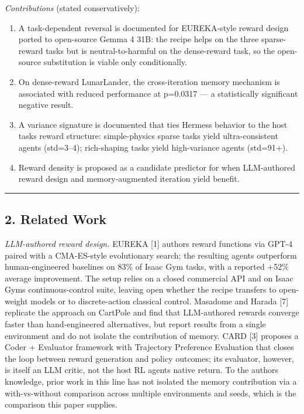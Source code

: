 \emph{Contributions} (stated conservatively):

\begin{enumerate}
\def\labelenumi{\arabic{enumi}.}
\tightlist
\item
  A task-dependent reversal is documented for EUREKA-style reward design ported to open-source Gemma 4 31B: the recipe helps on the three sparse-reward tasks but is neutral-to-harmful on the dense-reward task, so the open-source substitution is viable only conditionally.
\item
  On dense-reward LunarLander, the cross-iteration memory mechanism is associated with reduced performance at p=0.0317 --- a statistically significant negative result.
\item
  A variance signature is documented that ties Hermes\textquotesingle s behavior to the host task\textquotesingle s reward structure: simple-physics sparse tasks yield ultra-consistent agents (std=3--4); rich-shaping tasks yield high-variance agents (std=91+).
\item
  Reward density is proposed as a candidate predictor for when LLM-authored reward design and memory-augmented iteration yield benefit.
\end{enumerate}

\begin{center}\rule{0.5\linewidth}{0.5pt}\end{center}

\subsection{2. Related Work}\label{2-related-work}

\emph{LLM-authored reward design.} EUREKA {[}1{]} authors reward functions via GPT-4 paired with a CMA-ES-style evolutionary search; the resulting agents outperform human-engineered baselines on 83\% of Isaac Gym tasks, with a reported +52\% average improvement. The setup relies on a closed commercial API and on Isaac Gym\textquotesingle s continuous-control suite, leaving open whether the recipe transfers to open-weight models or to discrete-action classical control. Masadome and Harada {[}7{]} replicate the approach on CartPole and find that LLM-authored rewards converge faster than hand-engineered alternatives, but report results from a single environment and do not isolate the contribution of memory. CARD {[}3{]} proposes a Coder + Evaluator framework with Trajectory Preference Evaluation that closes the loop between reward generation and policy outcomes; its evaluator, however, is itself an LLM critic, not the host RL agent\textquotesingle s native return. To the authors\textquotesingle{} knowledge, prior work in this line has not isolated the memory contribution via a with-vs-without comparison across multiple environments and seeds, which is the comparison this paper supplies.

